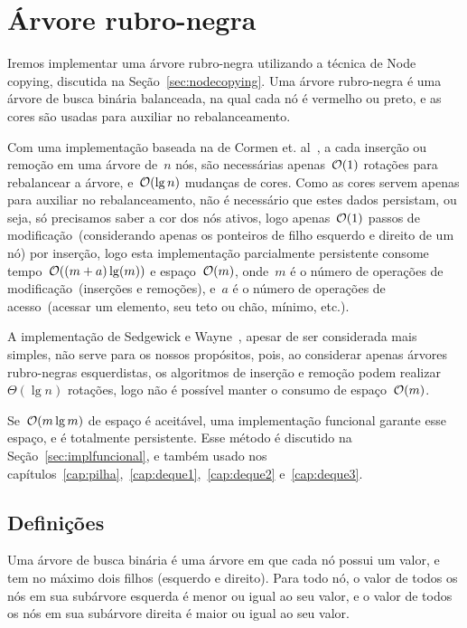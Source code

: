 \documentclass[../../main.tex]{subfiles}
\begin{document}
\chapter{Árvore rubro-negra} \label{cap:rubronegra}

Iremos implementar uma árvore rubro-negra utilizando a técnica de Node copying, discutida na Seção~\ref{sec:nodecopying}. Uma árvore rubro-negra é uma árvore de busca binária balanceada, na qual cada nó é vermelho ou preto, e as cores são usadas para auxiliar no rebalanceamento.

Com uma implementação baseada na de Cormen et. al~\cite{CormenRedBlack}, a cada inserção ou remoção em uma árvore de~$n$ nós, são necessárias apenas~$\mathcal{O}(1)$ rotações para rebalancear a árvore, e~$\mathcal{O}(\lg n)$ mudanças de cores. Como as cores servem apenas para auxiliar no rebalanceamento, não é necessário que estes dados persistam, ou seja, só precisamos saber a cor dos nós ativos, logo apenas~$\mathcal{O}(1)$ passos de modificação~(considerando apenas os ponteiros de filho esquerdo e direito de um nó) por inserção, logo esta implementação parcialmente persistente consome tempo~$\mathcal{O}((m + a) \lg(m))$ e espaço~$\mathcal{O}(m)$, onde~$m$ é o número de operações de modificação~(inserções e remoções), e~$a$ é o número de operações de acesso~(acessar um elemento, seu teto ou chão, mínimo, etc.).

A implementação de Sedgewick e Wayne~\cite{SedgewickRedBlack}, apesar de ser considerada mais simples, não serve para os nossos propósitos, pois, ao considerar apenas árvores rubro-negras esquerdistas, os algoritmos de inserção e remoção podem realizar~$\Theta(\lg n)$ rotações, logo não é possível manter o consumo de espaço~$\mathcal{O}(m)$.

Se~$\mathcal{O}(m \lg m)$ de espaço é aceitável, uma implementação funcional garante esse espaço, e é totalmente persistente. Esse método é discutido na Seção~\ref{sec:implfuncional}, e também usado nos capítulos~\ref{cap:pilha},~\ref{cap:deque1},~\ref{cap:deque2} e~\ref{cap:deque3}.

\section{Definições}

Uma árvore de busca binária é uma árvore em que cada nó possui um valor, e tem no máximo dois filhos (esquerdo e direito). Para todo nó, o valor de todos os nós em sua subárvore esquerda é menor ou igual ao seu valor, e o valor de todos os nós em sua subárvore direita é maior ou igual ao seu valor.
\end{document}
